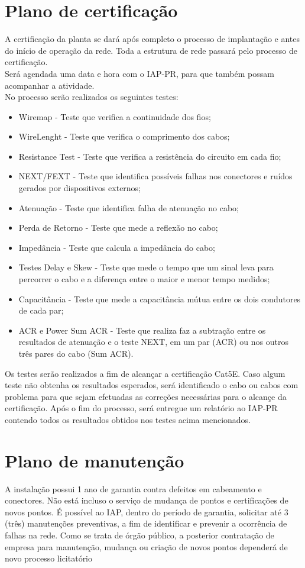 \documentclass[	DIV=calc,%
							paper=a4,%
							fontsize=12pt,%
							onecolumn]{scrartcl}	 					%
\begin{document}
\section{Plano de certificação}
A certificação da planta se dará após completo o processo de implantação e antes do início de operação da rede. Toda a estrutura de rede passará pelo processo de certificação.\\
Será agendada uma data e hora com o IAP-PR, para que também possam acompanhar a atividade.\\
No processo serão realizados os seguintes testes:
\begin{itemize}
\item Wiremap - Teste que verifica a continuidade dos fios;
\item WireLenght - Teste que verifica o comprimento dos cabos;
\item Resistance Test - Teste que verifica a resistência do circuito em cada fio;
\item NEXT/FEXT - Teste que identifica possíveis falhas nos conectores e ruídos gerados por dispositivos externos;
\item Atenuação - Teste que identifica falha de atenuação no cabo;
\item Perda de Retorno - Teste que mede a reflexão no cabo;
\item Impedância - Teste que calcula a impedância do cabo;
\item Testes Delay e Skew - Teste que mede o tempo que um sinal leva para percorrer o cabo e a diferença entre o maior e menor tempo medidos;
\item Capacitância - Teste que mede a capacitância mútua entre os dois condutores de cada par;
\item ACR e Power Sum ACR - Teste que realiza faz a subtração entre os resultados de atenuação e o teste NEXT, em um par (ACR) ou nos outros três pares do cabo (Sum ACR).
\end{itemize}
\par Os testes serão realizados a fim de alcançar a certificação Cat5E.
Caso algum teste não obtenha os resultados esperados, será identificado o cabo ou cabos com problema para que sejam efetuadas as correções necessárias para o alcançe da certificação.
Após o fim do processo, será entregue um relatório ao IAP-PR contendo todos os resultados obtidos nos testes acima mencionados.

\section{Plano de manutenção}
A instalação possui 1 ano de garantia contra defeitos em cabeamento e conectores. Não está incluso o serviço de mudança de pontos e certificações de novos pontos. É possível ao IAP, dentro do período de garantia, solicitar até 3 (três) manutenções preventivas, a fim de identificar e prevenir a ocorrência de falhas na rede.
Como se trata de órgão público, a posterior contratação de empresa para manutenção, mudança ou criação de novos pontos dependerá de novo processo licitatório
\end{document}
